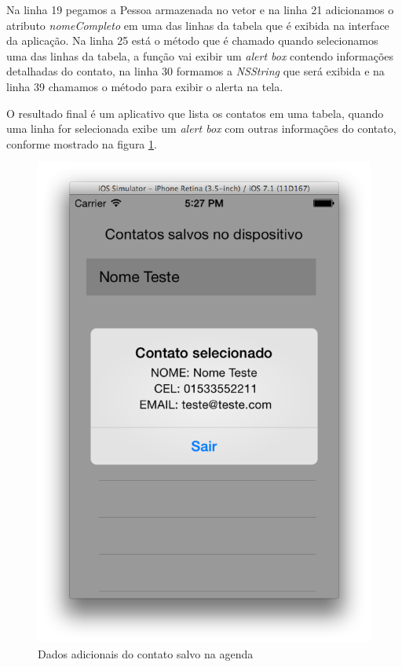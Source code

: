 \documentclass[a4paper,12pt,brazil,oneside]{book}
\begin{document}
Na linha 19 pegamos a Pessoa armazenada no vetor e na linha 21 adicionamos o atributo \emph{nomeCompleto} em uma das linhas da tabela que é exibida na interface da aplicação. Na linha 25 está o método que é chamado quando selecionamos uma das linhas da tabela, a função vai exibir um \emph{alert box} contendo informações detalhadas do contato, na linha 30 formamos a \emph{NSString} que será exibida e na linha 39 chamamos o método para exibir o alerta na tela.

O resultado final é um aplicativo que lista os contatos em uma tabela, quando uma linha for selecionada exibe um \emph{alert box} com outras informações do contato, conforme mostrado na figura \ref{fig:detalhesContato}.

\begin{figure}[H]
  \centering
  \includegraphics[totalheight=0.55\textheight]{figuras/4/api_contatos3.png}
  \caption{Dados adicionais do contato salvo na agenda}
  \label{fig:detalhesContato}
\end{figure}
\end{document}
